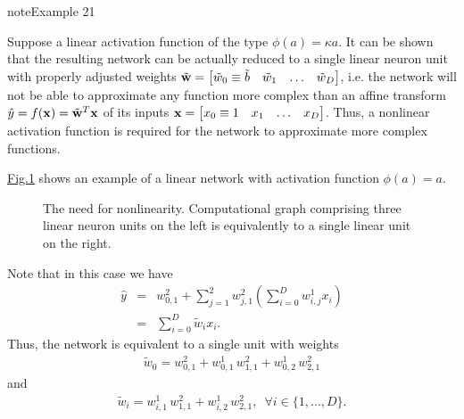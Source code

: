 \documentclass[letterpaper,10pt,english]{jupyterBook}
\let\sphinxpxdimen\pdfpxdimen\else\newdimen\sphinxpxdimen
\begin{document}
\begin{sphinxadmonition}{note}{Example 21}



\sphinxAtStartPar
Suppose a linear activation function of the type \( \phi(a) = \kappa a \). It can be shown that the resulting network can be actually reduced to a single linear neuron unit with properly adjusted weights \( \tilde{\bf w} = \begin{bmatrix} \tilde{w}_{0} \equiv \tilde{b} & \tilde{w}_{1} & \ldots & \tilde{w}_{D} \end{bmatrix} \), i.e. the network will not be able to approximate any function more complex than an affine transform \( \hat{y} = f({\bf x}) = \tilde{\bf w}^{T} {\bf x} \) of its inputs \( {\bf x} = \begin{bmatrix} {x}_{0} \equiv 1 & {x}_{1} & \ldots & {x}_{D} \end{bmatrix} \). Thus, a non\sphinxhyphen{}linear activation function is required for the network to approximate more complex functions.

\sphinxAtStartPar
\hyperref[\detokenize{neuralnets_func_approx:computational-graph4}]{Fig.\@ \ref{\detokenize{neuralnets_func_approx:computational-graph4}}} shows an example of a linear network with activation function \( \phi(a) = a \).


\begin{figure}
\centering
\noindent\sphinxincludegraphics[height=320\sphinxpxdimen]{{example_ANN_linear_02}.png}
\caption{The need for non\sphinxhyphen{}linearity. Computational graph comprising three linear neuron units on the left is equivalently to a single linear unit on the right.}\label{\detokenize{neuralnets_func_approx:computational-graph4}}\end{figure}

\sphinxAtStartPar
Note that in this case we have
\label{equation:neuralnets_func_approx:36d0f0ff-fa8f-4724-ba0b-249b875fc216}\begin{eqnarray}
\hat{y} &=& w_{0,1}^{2} + \sum_{j=1}^2 w^{2}_{j,1} \left( \sum_{i=0}^D w^{1}_{i,j} x_{i} \right) \nonumber \\
&=& \sum_{i=0}^D \tilde{w}_{i} x_{i}. \nonumber
\end{eqnarray}
\sphinxAtStartPar
Thus, the network is equivalent to a single unit with weights \begin{equation*}
\begin{split} \tilde{w}_{0} = {w^{2}_{0,1}} + w^{1}_{0,1} \, w^{2}_{1,1} +  w^{1}_{0,2} \, w^{2}_{2,1} \end{split}
\end{equation*} and \begin{equation*}
\begin{split} \tilde{w}_{i} = w^{1}_{i,1} \, w^{2}_{1,1} +  w^{1}_{i,2} \, w^{2}_{2,1}, \,\,\, \forall i \in \lbrace 1, \ldots, D \rbrace. \end{split}
\end{equation*}
\end{sphinxadmonition}
\end{document}

